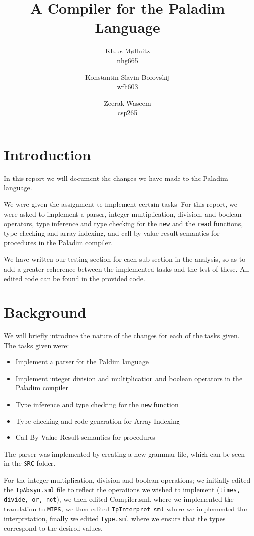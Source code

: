 \documentclass[10pt]{article}
\title{A Compiler for the \textbf{Paladim} Language}
\author{
    Klaus Møllnitz\\
    nhg665
  \and
    Konstantin Slavin-Borovskij\\
    wfb603
  \and
    Zeerak Waseem\\
    csp265
}
\begin{document}
\maketitle

\renewcommand{\contentsname}{\section{Table of contents}}
\tableofcontents
\newpage
\section{Introduction}
In this report we will document the changes we have made to the Paladim language. 

We were given the assignment to implement certain tasks. For this report, we were asked to implement a parser, integer multiplication, division, and boolean operators, type inference and type checking for the \texttt{new} and the \texttt{read} functions, type checking and array indexing, and call-by-value-result semantics for procedures in the Paladim compiler.

We have written our testing section for each sub section in the analysis, so as to add a greater coherence between the implemented tasks and the test of these. All edited code can be found in the provided code.

\section{Background}

We will briefly introduce the nature of the changes for each of the tasks given. The tasks given were:
\begin{itemize}
\item Implement a parser for the Paldim language
\item Implement integer division and multiplication and boolean operators in the Paladim compiler
\item Type inference and type checking for the \texttt{new} function
\item Type checking and code generation for Array Indexing
\item Call-By-Value-Result semantics for procedures
\end{itemize}

The parser was implemented by creating a new grammar file, which can be seen in the \texttt{SRC} folder.

For the integer multiplication, division and boolean operations; we initially edited the \texttt{TpAbsyn.sml} file to reflect the operations we wished to implement (\texttt{times, divide, or, not}), we then edited Compiler.sml, where we implemented the translation to \texttt{MIPS}, we then edited \texttt{TpInterpret.sml} where we implemented the interpretation, finally we edited \texttt{Type.sml} where we ensure that the types correspond to the desired values.
\end{document}
